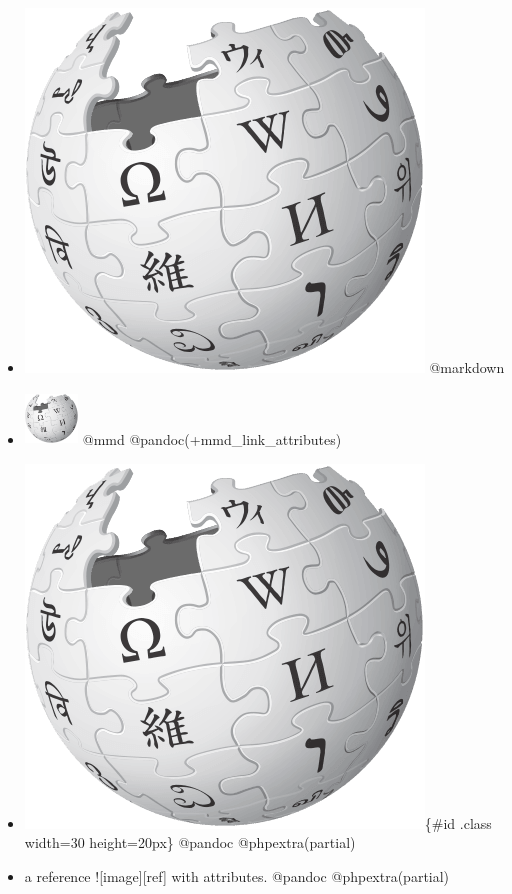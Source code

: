 \begin{itemize}
\item \includegraphics[keepaspectratio,width=\textwidth,height=0.75\textheight]{image.png} @markdown

\item \includegraphics[width=40pt,height=40pt]{image.png} @mmd @pandoc(+mmd\_link\_attributes)

\item \includegraphics[keepaspectratio,width=\textwidth,height=0.75\textheight]{image.png}\{\#id .class width=30 height=20px\} @pandoc @phpextra(partial)

\item a reference ![image][ref] with attributes. @pandoc @phpextra(partial)

\end{itemize}

